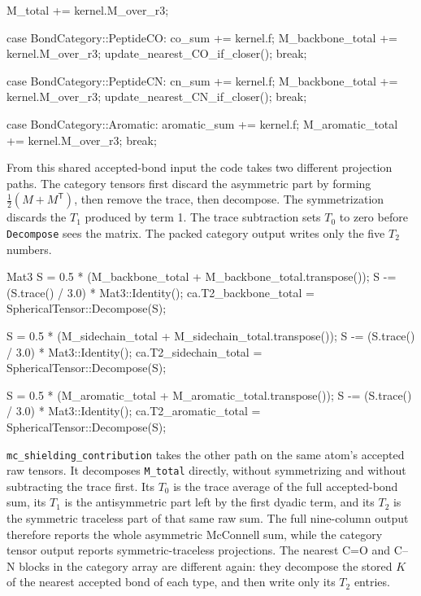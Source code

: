\documentclass[11pt]{article}
\newcommand{\code}[1]{\texttt{#1}}
\begin{document}
\begin{codebox}
M_total += kernel.M_over_r3;

case BondCategory::PeptideCO:
    co_sum += kernel.f;
    M_backbone_total += kernel.M_over_r3;
    update_nearest_CO_if_closer();
    break;

case BondCategory::PeptideCN:
    cn_sum += kernel.f;
    M_backbone_total += kernel.M_over_r3;
    update_nearest_CN_if_closer();
    break;

case BondCategory::Aromatic:
    aromatic_sum += kernel.f;
    M_aromatic_total += kernel.M_over_r3;
    break;
\end{codebox}

From this shared accepted-bond input the code takes two different projection
paths. The category tensors first discard the asymmetric part by forming
\(\frac12(M+M^{\mathsf T})\), then remove the trace, then decompose. The
symmetrization discards the \(T_1\) produced by term 1. The trace subtraction
sets \(T_0\) to zero before \code{Decompose} sees the matrix. The packed
category output writes only the five \(T_2\) numbers.

\begin{codebox}
Mat3 S = 0.5 * (M_backbone_total + M_backbone_total.transpose());
S -= (S.trace() / 3.0) * Mat3::Identity();
ca.T2_backbone_total = SphericalTensor::Decompose(S);

S = 0.5 * (M_sidechain_total + M_sidechain_total.transpose());
S -= (S.trace() / 3.0) * Mat3::Identity();
ca.T2_sidechain_total = SphericalTensor::Decompose(S);

S = 0.5 * (M_aromatic_total + M_aromatic_total.transpose());
S -= (S.trace() / 3.0) * Mat3::Identity();
ca.T2_aromatic_total = SphericalTensor::Decompose(S);
\end{codebox}

\code{mc\_shielding\_contribution} takes the other path on the same atom's
accepted raw tensors. It decomposes \code{M\_total} directly, without
symmetrizing and without subtracting the trace first. Its \(T_0\) is the trace
average of the full accepted-bond sum, its \(T_1\) is the antisymmetric part
left by the first dyadic term, and its \(T_2\) is the symmetric traceless part
of that same raw sum. The full nine-column output therefore reports the whole
asymmetric McConnell sum, while the category tensor output reports
symmetric-traceless projections. The nearest C=O and C--N blocks in the
category array are different again: they decompose the stored \(K\) of the
nearest accepted bond of each type, and then write only its \(T_2\) entries.
\end{document}
